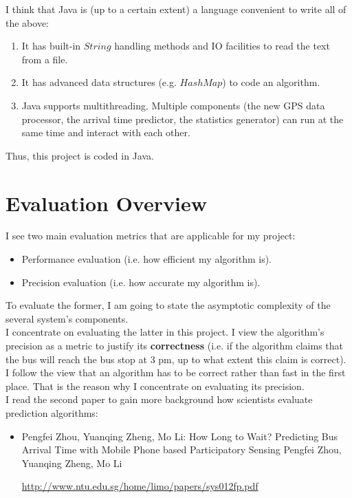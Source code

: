 \documentclass[12pt,a4paper,oneside,openright]{report}
\begin{document}
I think that Java is (up to a certain extent) a language convenient to write all of the above:

\begin{enumerate}
\item It has built-in $String$ handling methods and IO facilities to read the text from a file.
\item It has advanced data structures (e.g. $HashMap$) to code an algorithm.
\item Java supports multithreading. Multiple components (the new GPS data processor, the arrival time
      predictor, the statistics generator) can run at the same time and interact with each other.
\end{enumerate}

Thus, this project is coded in Java.

\newpage 

\section{Evaluation Overview}

I see two main evaluation metrics that are applicable for my project:

\begin{itemize}

\item Performance evaluation (i.e. how efficient my algorithm is).

\item Precision evaluation (i.e. how accurate my algorithm is).

\end{itemize}

To evaluate the former, I am going to state the asymptotic complexity of the several
system's components. \\

I concentrate on evaluating the latter in this project. I view the algorithm's precision as
a metric to justify its \textbf{correctness} (i.e. if the algorithm claims that the bus will reach the bus stop at 3 pm, up to what extent this claim is correct). I follow the view that an algorithm has
to be correct rather than fast in the first place. That is the reason why I concentrate
on evaluating its precision. \\

I read the second paper to gain more background how scientists evaluate prediction algorithms:

\begin{itemize}

\item Pengfei Zhou, Yuanqing Zheng, Mo Li: How Long to Wait? Predicting Bus Arrival Time
      with Mobile Phone based Participatory Sensing Pengfei Zhou, Yuanqing Zheng, Mo Li

\textcolor{blue}{\url{http://www.ntu.edu.sg/home/limo/papers/sys012fp.pdf}}

\end{itemize}
\end{document}
